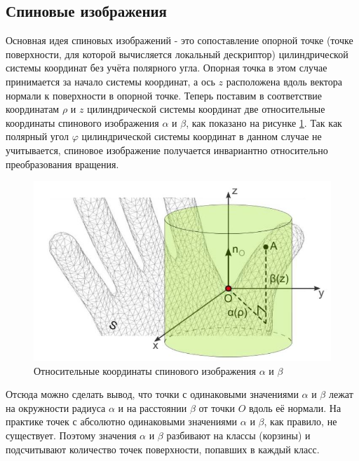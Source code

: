 \documentclass[14pt]{article}
\numberwithin{figure}{section}
\numberwithin{equation}{section}
\begin{document}
\subsection{Спиновые изображения}

Основная идея спиновых изображений - это сопоставление опорной точке (точке поверхности, для которой вычисляется локальный дескриптор) цилиндрической системы координат без учёта полярного угла. Опорная точка в этом случае принимается за начало системы координат, а ось $z$ расположена вдоль вектора нормали к поверхности в опорной точке. Теперь поставим в соответствие координатам $\rho$ и $z$ цилиндрической системы координат две относительные координаты спинового изображения $\alpha$ и $\beta$, как показано на рисунке \ref{ris:2}. Так как полярный угол $\varphi$ цилиндрической системы координат в данном случае не учитывается, спиновое изображение получается инвариантно относительно преобразования вращения.

\begin{figure}[h]
	\begin{center}
		\includegraphics[scale=0.9]{2.JPG}
		\caption{Относительные координаты спинового изображения $\alpha$ и $\beta$}
		\label{ris:2}
	\end{center}
\end{figure}

Отсюда можно сделать вывод, что точки с одинаковыми значениями $\alpha$ и $\beta$ лежат на окружности радиуса $\alpha$ и на расстоянии $\beta$ от точки $O$ вдоль её нормали. На практике точек с абсолютно одинаковыми значениями $\alpha$ и $\beta$, как правило, не существует. Поэтому значения $\alpha$ и $\beta$ разбивают на классы (корзины) и подсчитывают количество точек поверхности, попавших в каждый класс.
\end{document}
